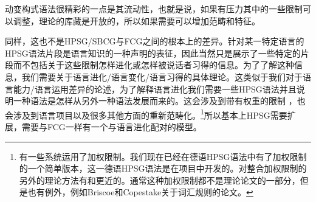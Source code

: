 

动变构式语法很精彩的一点是其流动性，也就是说，如果有压力其中的一些限制可以调整，理论的库藏是开放的，所以如果需要可以增加范畴和特征。

同样，这也不是HPSG/SBCG与FCG之间的根本上的差异。针对某一特定语言的HPSG语法片段是语言知识的一种声明的表征，因此当然只是展示了一些特定的片段而不包括关于这些限制怎样进化或怎样被说话者习得的信息。为了了解这种信息，我们需要关于语言进化/语言变化/语言习得的具体理论。这类似于我们对于语言能力/语言运用差异的论述，为了解释语言进化我们需要一些HPSG语法并且说明一种语法是怎样从另外一种语法发展而来的。这会涉及到带有权重的限制 ，也会涉及到语言项目以及很多其他方面的重新范畴化。\footnote{%
有一些系统运用了加权限制。我们现在已经在德语HPSG语法中有了加权限制的一个简单版本，这一德语HPSG语法是在\verbmobil 项目中开发的\citep{MK2000a}。对整合加权限制的另外的理论方法有和更近的。通常这种加权限制都不是理论论文的一部分，但是也有例外，例如Briscoe和Copestake关于词汇规则的论文\citep{BC99a}。  
}所以基本上HPSG需要扩展，需要与FCG一样有一个与语言进化配对的模型。
